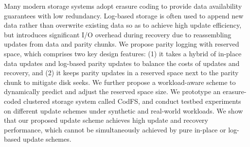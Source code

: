 Many modern storage systems adopt erasure coding to provide data availability
guarantees with low redundancy.  Log-based storage is often used to
append new data rather than overwrite existing data so as to achieve high
update efficiency, but introduces significant I/O overhead during recovery due
to reassembling updates from data and parity chunks.  We propose parity
logging with reserved space, which comprises two key design features: (1) it
takes a hybrid of in-place data updates and log-based parity updates to
balance the costs of updates and recovery, and (2) it keeps parity updates in
a reserved space next to the parity chunk to mitigate disk seeks.  We further
propose a workload-aware scheme to dynamically predict and adjust the reserved
space size.  We prototype an erasure-coded clustered storage system called
CodFS, and conduct testbed experiments on different
update schemes under synthetic and real-world workloads.  We show that
our proposed update scheme achieves high update and recovery
performance, which cannot be simultaneously achieved by pure in-place or
log-based update schemes.
